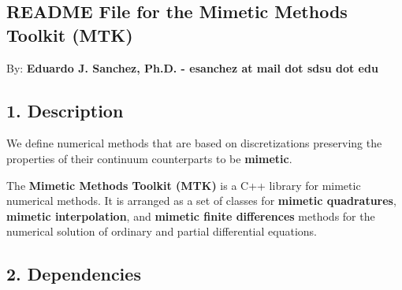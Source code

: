
\begin{DoxyPre}
\section*{README File for the Mimetic Methods Toolkit (MTK)}\end{DoxyPre}



\begin{DoxyPre}\end{DoxyPre}



\begin{DoxyPre}By: {\bfseries Eduardo J. Sanchez, Ph.D. - esanchez at mail dot sdsu dot edu}\end{DoxyPre}



\begin{DoxyPre}\subsection*{1. Description}\end{DoxyPre}



\begin{DoxyPre}\end{DoxyPre}



\begin{DoxyPre}We define numerical methods that are based on discretizations preserving the
properties of their continuum counterparts to be {\bfseries mimetic}.\end{DoxyPre}



\begin{DoxyPre}The {\bfseries Mimetic Methods Toolkit (MTK)} is a C++ library for mimetic numerical
methods. It is arranged as a set of classes for {\bfseries mimetic quadratures},
{\bfseries mimetic interpolation}, and {\bfseries mimetic finite differences} methods for the
numerical solution of ordinary and partial differential equations.\end{DoxyPre}



\begin{DoxyPre}\subsection*{2. Dependencies}\end{DoxyPre}



